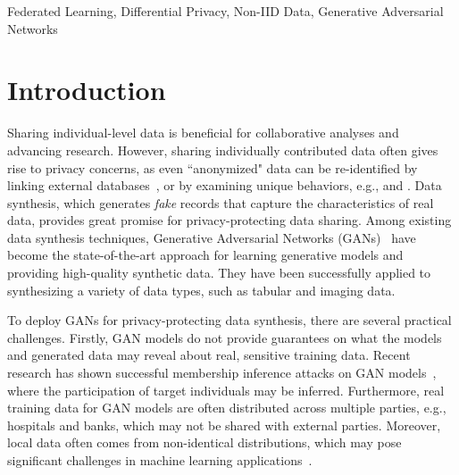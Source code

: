 \documentclass[conference]{IEEEtran}
\begin{document}
\begin{IEEEkeywords}
Federated Learning, Differential Privacy, Non-IID Data, Generative Adversarial Networks
\end{IEEEkeywords}


\section{Introduction}

Sharing individual-level data is beneficial for collaborative analyses and advancing research. However, sharing individually contributed data often gives rise to privacy concerns, as even ``anonymized" data can be re-identified by linking external databases~\cite{SweeneyKAno2002}, or by examining unique behaviors, e.g., \cite{BarbaroExposed2006} and \cite{MontjoyeUnique2013}. Data synthesis, which generates \textit{fake} records that capture the characteristics of real data, provides great promise for privacy-protecting data sharing.  Among existing data synthesis techniques, Generative Adversarial Networks (GANs)~\cite{GANGoodFellow2014} have become the state-of-the-art approach for learning generative models and providing high-quality synthetic data. They have been successfully applied to synthesizing a variety of data types, such as tabular and imaging data. 

To deploy GANs for privacy-protecting data synthesis, there are several practical challenges. Firstly, GAN models do not provide guarantees on what the models and generated data may reveal about real, sensitive training data. Recent research has shown successful membership inference attacks on GAN models~\cite{WBAttack2018,ChenGANLeaks_2020}, where the participation of target individuals may be inferred. Furthermore, real training data for GAN models are often distributed across multiple parties, e.g., hospitals and banks, which may not be shared with external parties. Moreover, local data often comes from non-identical distributions, which may pose significant challenges in machine learning applications~\cite{HsiehNonIIDData2019}. 
\end{document}
